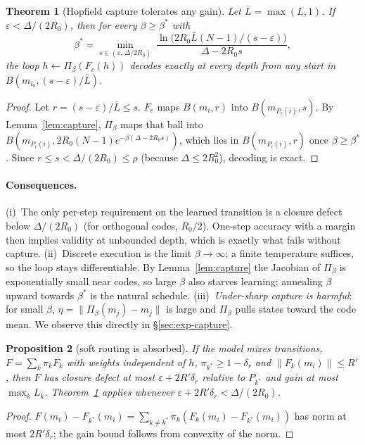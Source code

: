 \documentclass[11pt]{article}
\newtheorem{theorem}{Theorem}
\newtheorem{proposition}[theorem]{Proposition}
\theoremstyle{definition}
\theoremstyle{remark}
\newcommand{\norm}[1]{\lVert #1\rVert}
\begin{document}
\begin{theorem}[Hopfield capture tolerates any gain]\label{thm:hopfield}
Let $\bar L=\max(L,1)$. If $\varepsilon<\Delta/(2R_0)$, then for every $\beta\ge\beta^*$ with
\[
\beta^*=\min_{s\in(\varepsilon,\,\Delta/2R_0)}\ \frac{\ln\!\big(2R_0\bar L(N-1)/(s-\varepsilon)\big)}{\Delta-2R_0s},
\]
the loop $h\leftarrow\Pi_\beta(F_c(h))$ decodes exactly at every depth from any start in
$B(m_{i_0},(s-\varepsilon)/\bar L)$.
\end{theorem}
\begin{proof}
Let $r=(s-\varepsilon)/\bar L\le s$. $F_c$ maps $B(m_i,r)$ into $B(m_{P_c(i)},s)$. By
Lemma~\ref{lem:capture}, $\Pi_\beta$ maps that ball into $B(m_{P_c(i)},2R_0(N-1)e^{-\beta(\Delta-2R_0s)})$,
which lies in $B(m_{P_c(i)},r)$ once $\beta\ge\beta^*$. Since $r\le s<\Delta/(2R_0)\le\rho$
(because $\Delta\le2R_0^2$), decoding is exact.
\end{proof}

\paragraph{Consequences.}
(i)~The only per-step requirement on the learned transition is a closure defect below
$\Delta/(2R_0)$ (for orthogonal codes, $R_0/2$). One-step accuracy with a margin then implies
validity at unbounded depth, which is exactly what fails without capture.
(ii)~Discrete execution is the limit $\beta\to\infty$; a finite temperature suffices, so the loop
stays differentiable. By Lemma~\ref{lem:capture} the Jacobian of $\Pi_\beta$ is exponentially
small near codes, so large $\beta$ also starves learning; annealing $\beta$ upward towards
$\beta^*$ is the natural schedule.
(iii)~\emph{Under-sharp capture is harmful}: for small $\beta$, $\eta=\norm{\Pi_\beta(m_j)-m_j}$ is
large and $\Pi_\beta$ pulls states toward the code mean. We observe this directly in
\S\ref{sec:exp-capture}.

\begin{proposition}[soft routing is absorbed]\label{prop:routing}
If the model mixes transitions, $F=\sum_k\pi_kF_k$ with weights independent of $h$,
$\pi_{k^*}\ge1-\delta_r$ and
$\norm{F_k(m_i)}\le R'$, then $F$ has closure defect at most $\varepsilon+2R'\delta_r$ relative to
$P_{k^*}$ and gain at most $\max_kL_k$. Theorem~\ref{thm:hopfield} applies whenever
$\varepsilon+2R'\delta_r<\Delta/(2R_0)$.
\end{proposition}
\begin{proof}
$F(m_i)-F_{k^*}(m_i)=\sum_{k\ne k^*}\pi_k(F_k(m_i)-F_{k^*}(m_i))$ has norm at most
$2R'\delta_r$; the gain bound follows from convexity of the norm.
\end{proof}
\end{document}
